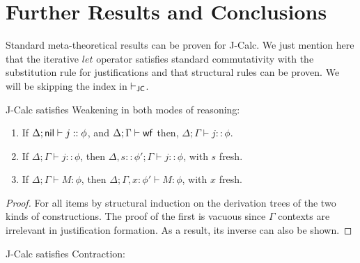 {\section{Further Results and Conclusions}\label{sec:Meta}

Standard meta-theoretical results can be proven for  {\sf J-Calc}. We just mention here that the iterative $let$ operator satisfies standard commutativity with the substitution rule for justifications and that structural rules can be proven. We will be skipping the index in $\vdash_{\sf JC}$.

\begin{theorem}[Weakening]
{\sf J-Calc} satisfies Weakening in both modes of reasoning:

\begin{enumerate}
\item If $\Delta; {\sf nil}\vdash j::\phi$, and $\Delta; {\Gamma}\vdash{\sf wf} $ then, $\Delta; \Gamma \vdash j::\phi$.
\item If $\Delta; \Gamma \vdash j::\phi$, then $\Delta, s::\phi'; \Gamma \vdash j::\phi$, with $s$ fresh.
\item If $\Delta; {\Gamma} \vdash M:\phi$, then $\Delta; \Gamma, x\!:\!\phi' \vdash M:\phi$, with $x$ fresh.
\end{enumerate}
\end{theorem}
\begin{proof}
For all items by structural induction on the derivation trees  of the two kinds of constructions. The proof of the first is vacuous since $\Gamma$ contexts are irrelevant in justification formation. As a result, its inverse can also be shown.
\end{proof}
\begin{theorem}[Contraction]
{\sf J-Calc} satisfies Contraction:


\end{theorem}}
